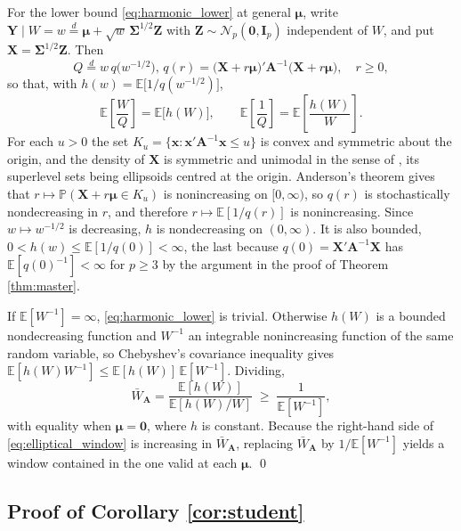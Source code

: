 \documentclass[a4paper,fleqn]{cas-dc}
\theoremstyle{plain}
\theoremstyle{definition}
\theoremstyle{remark}
\newenvironment{revblock}{}{}
\newcommand{\E}{\mathbb{E}}
\begin{document}
\begin{appendices}
For the lower bound \eqref{eq:harmonic_lower} at general $\bm\mu$, write $\bm Y\mid W=w\stackrel{d}{=}\bm\mu+\sqrt w\,\bm\Sigma^{1/2}\bm Z$ with $\bm Z\sim\mathcal N_p(\bm 0,\bm I_p)$ independent of $W$, and put $\bm X=\bm\Sigma^{1/2}\bm Z$. Then
\begin{equation}
Q\stackrel{d}{=}w\,q\bigl(w^{-1/2}\bigr),
\,
q(r)=\bigl(\bm X+r\bm\mu\bigr)'\bm A^{-1}\bigl(\bm X+r\bm\mu\bigr),
\quad r\ge0,
\end{equation}
so that, with $h(w)=\E\bigl[1/q(w^{-1/2})\bigr]$,
\begin{equation}
\E\left[\frac{W}{Q}\right]=\E\bigl[h(W)\bigr],
\qquad
\E\left[\frac{1}{Q}\right]=\E\left[\frac{h(W)}{W}\right].
\end{equation}
For each $u>0$ the set $K_u=\{\bm x:\bm x'\bm A^{-1}\bm x\le u\}$ is convex and symmetric about the origin, and the density of $\bm X$ is symmetric and unimodal in the sense of \citet{anderson1955}, its superlevel sets being ellipsoids centred at the origin. Anderson's theorem gives that $r\mapsto\mathbb P(\bm X+r\bm\mu\in K_u)$ is nonincreasing on $[0,\infty)$, so $q(r)$ is stochastically nondecreasing in $r$, and therefore $r\mapsto\E[1/q(r)]$ is nonincreasing. Since $w\mapsto w^{-1/2}$ is decreasing, $h$ is nondecreasing on $(0,\infty)$. It is also bounded, $0<h(w)\le\E[1/q(0)]<\infty$, the last because $q(0)=\bm X'\bm A^{-1}\bm X$ has $\E[q(0)^{-1}]<\infty$ for $p\ge3$ by the argument in the proof of Theorem \ref{thm:master}.

If $\E[W^{-1}]=\infty$, \eqref{eq:harmonic_lower} is trivial. Otherwise $h(W)$ is a bounded nondecreasing function and $W^{-1}$ an integrable nonincreasing function of the same random variable, so Chebyshev's covariance inequality gives $\E[h(W)W^{-1}]\le\E[h(W)]\,\E[W^{-1}]$. Dividing,
\begin{equation}
\bar W_{\bm A}=\frac{\E[h(W)]}{\E[h(W)/W]}\;\ge\;\frac{1}{\E[W^{-1}]} ,
\end{equation}
with equality when $\bm\mu=\bm 0$, where $h$ is constant. Because the right-hand side of \eqref{eq:elliptical_window} is increasing in $\bar W_{\bm A}$, replacing $\bar W_{\bm A}$ by $1/\E[W^{-1}]$ yields a window contained in the one valid at each $\bm\mu$.
\qed

\subsection*{Proof of Corollary \ref{cor:student}}


\end{appendices}
\end{document}
